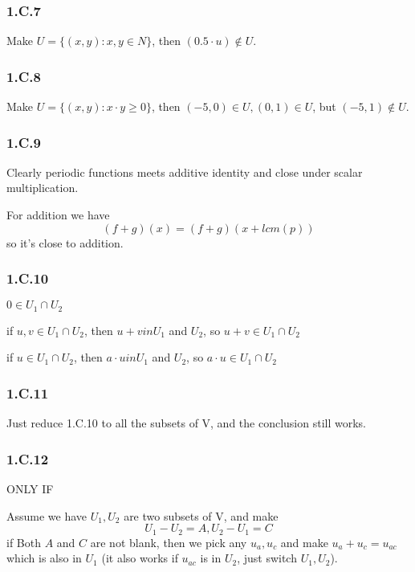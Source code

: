 \subsubsection*{1.C.7}

Make $U=\{(x, y): x, y\in N\}$, then $(0.5\cdot u) \notin U $.

\subsubsection*{1.C.8}

Make $U=\{(x, y): x\cdot y \geq 0\}$, then $(-5,0) \in U, (0,1) \in U$, but $(-5, 1) \notin U$.

\subsubsection*{1.C.9}

Clearly periodic functions meets additive identity and close under scalar multiplication. 

For addition we have 
\[(f+g)(x) = (f+g)(x+lcm(p))\]
so it's close to addition.

\subsubsection*{1.C.10}
$0 \in U_{1} \cap U_{2}$

if $ u, v \in U_{1} \cap U_{2}$, then $u+v in U_{1}$ and $U_{2}$, so $u+v \in U_{1} \cap U_{2}$

if $ u \in U_{1} \cap U_{2}$, then $a\cdot u in U_{1}$ and $U_{2}$, so $a\cdot u \in U_{1} \cap U_{2}$

\subsubsection*{1.C.11}

Just reduce 1.C.10 to all the subsets of V, and the conclusion still works.

\subsubsection*{1.C.12}

ONLY IF

Assume we have $U_{1}, U_{2}$ are two subsets of V, and make
\[U_{1} - U_{2} = A, U_{2} - U_{1} = C\]
if Both $A$ and $C$ are not blank, then we pick any $u_{a}, u_{c}$ and make $u_{a} + u_{c} = u_{ac}$ which is also in $U_{1}$ (it also works if $u_{ac}$ is in $U_{2}$, just switch $U_{1}, U_{2}$).

